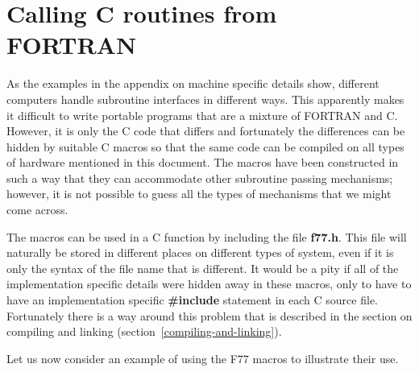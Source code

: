 \section{Calling C routines from FORTRAN}
\label{f77:c-from-f}

As the examples in the appendix on machine specific details show, different
computers handle subroutine interfaces in different ways. This apparently makes
it difficult to write portable programs that are a mixture of FORTRAN and C.
However, it is only the C code that differs and fortunately the differences can
be hidden by suitable C macros so that the same code can be compiled on all
types of hardware mentioned in this document. The macros have been constructed
in such a way that they can accommodate other subroutine passing mechanisms;
however, it is not possible to guess all the types of mechanisms that we might
come across.

The macros can be used in a C function by including the file {\bf f77.h}. This
file will naturally be stored in different places on different types of system,
even if it is only the syntax of the file name that is different. It would be a
pity if all of the implementation specific details were hidden away in these
macros, only to have to have an implementation specific {\bf \#include}
statement in each C source file. Fortunately there is a way around this
problem that is described in the section on compiling and linking
(section~\ref{compiling-and-linking}).

Let us now consider an example of using the F77 macros to illustrate
their use.

